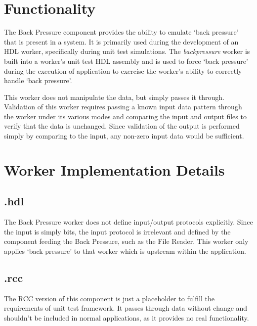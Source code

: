 \section*{Functionality}
\begin{flushleft}
	The Back Pressure component provides the ability to emulate `back pressure'
that is present in a system. It is primarily used during the development of an HDL worker,
specifically during unit test simulations. The \textit{backpressure} worker is built
into a worker's unit test HDL assembly and is used to force `back pressure'
during the execution of application to exercise the worker's ability to correctly handle
`back pressure'.\medskip

	This worker does not manipulate the data, but simply passes it through.
Validation of this worker requires passing a known input data pattern
through the worker under its various modes and comparing the input and
output files to verify that the data is unchanged. Since validation of the
output is performed simply by comparing to the input, any non-zero input
data would be sufficient.\medskip
\end{flushleft}

\section*{Worker Implementation Details}
\subsection*{\comp.hdl}
\begin{flushleft}
	The Back Pressure worker does not define input/output protocols explicitly. Since the input is simply bits, the input protocol is irrelevant and defined by the component feeding the Back Pressure, such as the File Reader. This worker only applies `back pressure' to that worker which is upstream within the application.\medskip
\end{flushleft}

\subsection*{\comp.rcc}
\begin{flushleft}
The RCC version of this component is just a placeholder to fulfill the requirements of unit test framework. It passes through data without change and shouldn't be included in normal applications, as it provides no real functionality.
\end{flushleft}

